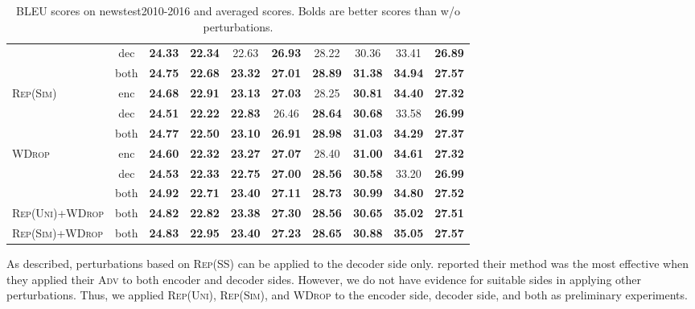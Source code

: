 \documentclass[11pt]{article}
\newcommand{\uniform}{\textsc{Rep(Uni)}}
\newcommand{\parass}{\textsc{Rep(SS)}}
\newcommand{\similarity}{\textsc{Rep(Sim)}}
\newcommand{\worddrop}{\textsc{WDrop}}
\newcommand{\adv}{\textsc{Adv}}
\begin{document}
\begin{table*}[!t]
\begin{tabular}{ l | c | c c c c c c c | c }
  & dec &  \textbf{24.33} & \textbf{22.34} & 22.63 & \textbf{26.93} & 28.22 & 30.36 & 33.41 & \textbf{26.89} \\
  & both & \textbf{24.75} & \textbf{22.68} & \textbf{23.32} & \textbf{27.01} & \textbf{28.89} & \textbf{31.38} & \textbf{34.94} & \textbf{27.57} \\ \hline
  \multirow{3}{*}{\similarity{}} & enc &\textbf{24.68} & \textbf{22.91} & \textbf{23.13} & \textbf{27.03} & 28.25 & \textbf{30.81} & \textbf{34.40} & \textbf{27.32} \\ 
  & dec & \textbf{24.51} & \textbf{22.22} & \textbf{22.83} & 26.46 & \textbf{28.64} & \textbf{30.68} & 33.58 & \textbf{26.99} \\
  & both &\textbf{24.77} & \textbf{22.50} & \textbf{23.10} & \textbf{26.91} & \textbf{28.98} & \textbf{31.03} & \textbf{34.29}& \textbf{27.37} \\ \hline
  \multirow{3}{*}{\worddrop{}} & enc & \textbf{24.60} & \textbf{22.32} & \textbf{23.27} & \textbf{27.07} & 28.40 & \textbf{31.00} & \textbf{34.61} & \textbf{27.32} \\
  & dec & \textbf{24.53} & \textbf{22.33} & \textbf{22.75} & \textbf{27.00} & \textbf{28.56} & \textbf{30.58} & 33.20 & \textbf{26.99} \\
  & both & \textbf{24.92} & \textbf{22.71} & \textbf{23.40} & \textbf{27.11} & \textbf{28.73} & \textbf{30.99} & \textbf{34.80} & \textbf{27.52} \\ \hline
  \uniform{}+\worddrop{} & both & \textbf{24.82} & \textbf{22.82} & \textbf{23.38} & \textbf{27.30} & \textbf{28.56} & \textbf{30.65} & \textbf{35.02} & \textbf{27.51} \\ \hline
  \similarity{}+\worddrop{} & both & \textbf{24.83} & \textbf{22.95} & \textbf{23.40} & \textbf{27.23} & \textbf{28.65} & \textbf{30.88} & \textbf{35.05} & \textbf{27.57} \\ \hline
  \end{tabular}
  \caption{BLEU scores on newstest2010-2016 and averaged scores. Bolds are better scores than w/o perturbations.\label{tab:exp_for_perturbation_pos}}
\end{table*}

As described, perturbations based on \parass{} can be applied to the decoder side only.
 reported their method was the most effective when they applied their \adv{} to both encoder and decoder sides.
However, we do not have evidence for suitable sides in applying other perturbations.
Thus, we applied \uniform{}, \similarity{}, and \worddrop{} to the encoder side, decoder side, and both as preliminary experiments.
\end{document}
